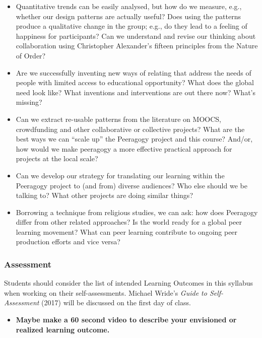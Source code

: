 \begin{itemize}
\tightlist
\item
  Quantitative trends can be easily analysed, but how do we measure,
  e.g., whether our design patterns are actually useful? Does using the
  patterns produce a qualitative change in the group; e.g., do they lead
  to a feeling of happiness for participants? Can we understand and
  revise our thinking about collaboration using Christopher Alexander's
  fifteen principles from the Nature of Order?
\item
  Are we successfully inventing new ways of relating that address the
  needs of people with limited access to educational opportunity? What
  does the global need look like? What inventions and interventions are
  out there now? What's missing?
\item
  Can we extract re-usable patterns from the literature on MOOCS,
  crowdfunding and other collaborative or collective projects? What are
  the best ways we can ``scale up'' the Peeragogy project and this
  course? And/or, how would we make peeragogy a more effective practical
  approach for projects at the local scale?
\item
  Can we develop our strategy for translating our learning within the
  Peeragogy project to (and from) diverse audiences? Who else should we
  be talking to? What other projects are doing similar things?
\item
  Borrowing a technique from religious studies, we can ask: how does
  Peeragogy differ from other related approaches? Is the world ready for
  a global peer learning movement? What can peer learning contribute to
  ongoing peer production efforts and vice versa?
\end{itemize}

\hypertarget{assessment}{%
\subsubsection{Assessment}\label{assessment}}

Students should consider the list of intended Learning Outcomes in this
syllabus when working on their self-assessments. Michael Wride's
\emph{Guide to Self-Assessment} (2017) will be discussed on the first
day of class.

\begin{itemize}
\tightlist
\item
  \textbf{Maybe make a 60 second video to describe your envisioned or
  realized learning outcome.}
\end{itemize}

